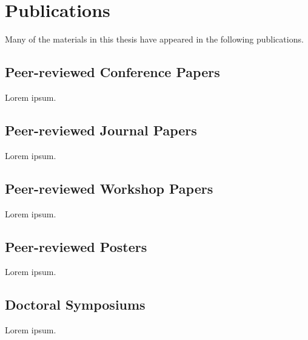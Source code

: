 \chapter{Publications}
\label{chap:publications}

Many of the materials in this thesis have appeared in the following publications.

\section*{Peer-reviewed Conference Papers}

Lorem ipsum.

\section*{Peer-reviewed Journal Papers}

Lorem ipsum.

\section*{Peer-reviewed Workshop Papers}

Lorem ipsum.

\section*{Peer-reviewed Posters}

Lorem ipsum.

\section*{Doctoral Symposiums}

Lorem ipsum.
